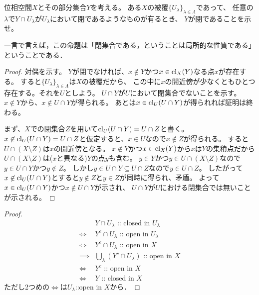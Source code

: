 \documentclass{jsarticle}
\begin{document}
    \begin{Prop}
        位相空間$X$とその部分集合$Y$を考える。
        ある$X$の被覆$\{ U_{\lambda} \}_{\lambda \in \Lambda}$であって、
        任意の$\lambda$で$Y \cap U_{\lambda}$が$U_{\lambda}$において閉であるようなものが有るとき、
        $Y$が閉であることを示せ。
    \end{Prop}
    一言で言えば，この命題は「閉集合である，ということは局所的な性質である」ということである．

    \begin{proof}
    対偶を示す。
    $Y$が閉でなければ、$x \not \in Y$かつ$x \in \operatorname{cl}_{X}(Y)$なる点$x$が存在する。
    すると$\{ U_{\lambda} \}_{\lambda \in \Lambda}$は$X$の被覆だから、
    この中に$x$の開近傍が少なくともひとつ存在する。それを$U$としよう。
    $U \cap Y$が$U$において閉集合でないことを示す。
    $x \not \in Y$から、$x \not \in U \cap Y$が得られる。
    あとは$x \in \operatorname{cl}_{U}(U \cap Y)$が得られれば証明は終わる。

    まず、$X$での閉集合$Z$を用いて$\operatorname{cl}_{U}(U \cap Y)=U \cap Z$と書く。
    $x \not \in \operatorname{cl}_{U}(U \cap Y)=U \cap Z$と仮定すると、$x \in U$なので$x \not \in Z$が得られる。
    すると$U \cap (X \setminus Z)$は$x$の開近傍となる。
    $x \not \in Y$かつ$x \in \operatorname{cl}_{X}(Y)$から$x$は$Y$の集積点だから$U \cap (X \setminus Z)$は($x$と異なる)$Y$の点$y$も含む。
    $y \in Y$かつ$y \in U \cap (X \setminus Z)$なので$y \in U \cap Y$かつ$y \not \in Z$。
    しかし$y \in U \cap Y \subseteq U \cap Z$なので$y \in U \cap Z$。
    したがって$x \not \in \operatorname{cl}_{U}(U \cap Y)$とすると$y \not \in Z$と$y \in Z$が同時に得られ、矛盾。
    よって$x \in \operatorname{cl}_{U}(U \cap Y)$かつ$x \not \in U \cap Y$が示され、
    $U \cap Y$が$U$における閉集合では無いことが示される。
    \end{proof}
    \begin{proof}
        \begin{align*}
            {}&         Y \cap U_{\lambda} \text{ :: closed in } U_{\lambda} \\
            \iff&       Y^c \cap U_{\lambda} \text{ :: open in } U_{\lambda} \\ 
            \iff&       Y^c \cap U_{\lambda} \text{ :: open in } X \\ 
            \implies&   {\textstyle \bigcup_{\lambda}{(Y^c \cap U_{\lambda})}} \text{ :: open in } X \\ 
            \iff&       Y^c \text{ :: open in } X \\ 
            \iff&       Y \text{ :: closed in } X
        \end{align*}
        ただし2つめの$\iff$は$U_{\lambda}$::open in $X$から．
    \end{proof}
\end{document}
